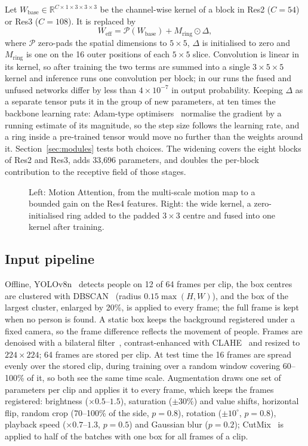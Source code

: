 \documentclass[conference]{IEEEtran}
\begin{document}
Let $W_{\text{base}} \in \mathbb{R}^{C \times 1 \times 3 \times 3 \times
3}$ be the channel-wise kernel of a block in Res2 ($C=54$) or Res3
($C=108$). It is replaced by
\begin{equation}
  W_{\text{eff}} = \mathcal{P}(W_{\text{base}}) + M_{\text{ring}} \odot \Delta ,
  \label{eq:rep}
\end{equation}
where $\mathcal{P}$ zero-pads the spatial dimensions to $5\times5$,
$\Delta$ is initialised to zero and $M_{\text{ring}}$ is one on the 16
outer positions of each $5\times5$ slice. Convolution is linear in its
kernel, so after training the two terms are summed into a single
$3\times5\times5$ kernel and inference runs one convolution per block; in
our runs the fused and unfused networks differ by less than
$4\times10^{-7}$ in output probability. Keeping $\Delta$ as a separate
tensor puts it in the group of new parameters, at ten times the backbone
learning rate: Adam-type optimisers~\cite{adamw} normalise the gradient by
a running estimate of its magnitude, so the step size follows the learning
rate, and a ring inside a pre-trained tensor would move no further than the
weights around it. Section~\ref{sec:modules} tests both choices. The
widening covers the eight blocks of Res2 and Res3, adds 33{,}696
parameters, and doubles the per-block contribution to the receptive field
of those stages.

\begin{figure}[t]
  \centering
  \caption{Left: Motion Attention, from the multi-scale motion map to a
  bounded gain on the Res4 features. Right: the wide kernel, a
  zero-initialised ring added to the padded $3\times3$ centre and fused
  into one kernel after training.}
  \label{fig:modules}
\end{figure}

\subsection{Input pipeline}

Offline, YOLOv8n~\cite{yolov8} detects people on 12 of 64 frames per clip,
the box centres are clustered with DBSCAN~\cite{dbscan} (radius
$0.15\max(H,W)$), and the box of the largest cluster, enlarged by 20\%, is
applied to every frame; the full frame is kept when no person is found. A
static box keeps the background registered under a fixed camera, so the
frame difference reflects the movement of people. Frames are denoised with
a bilateral filter~\cite{bilateral}, contrast-enhanced with
CLAHE~\cite{clahe} and resized to $224\times224$; 64 frames are stored per
clip. At test time the 16 frames are spread evenly over the stored clip,
during training over a random window covering 60--100\% of it, so both see
the same time scale. Augmentation draws one set of parameters per clip and
applies it to every frame, which keeps the frames registered: brightness
($\times0.5$--$1.5$), saturation ($\pm30\%$) and value shifts, horizontal
flip, random crop (70--100\% of the side, $p=0.8$), rotation
($\pm10^\circ$, $p=0.8$), playback speed ($\times0.7$--$1.3$, $p=0.5$) and
Gaussian blur ($p=0.2$); CutMix~\cite{cutmix} is applied to half of the
batches with one box for all frames of a clip.
\end{document}
